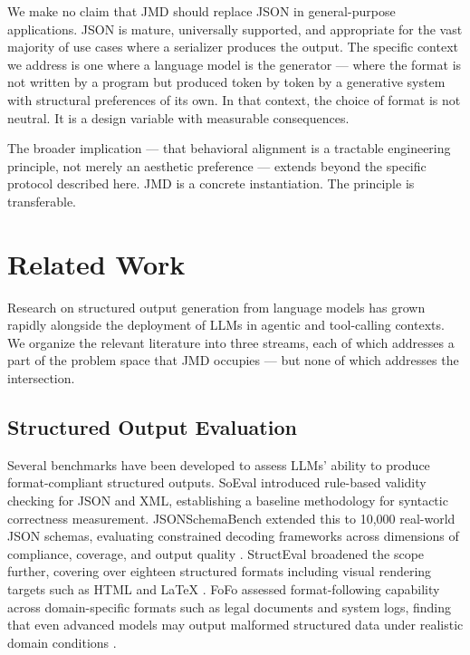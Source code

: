 \documentclass[11pt]{article}
\begin{document}
We make no claim that JMD should replace JSON in general-purpose applications. JSON is mature, universally supported, and appropriate for the vast majority of use cases where a serializer produces the output. The specific context we address is one where a language model is the generator --- where the format is not written by a program but produced token by token by a generative system with structural preferences of its own. In that context, the choice of format is not neutral. It is a design variable with measurable consequences.

The broader implication --- that behavioral alignment is a tractable engineering principle, not merely an aesthetic preference --- extends beyond the specific protocol described here. JMD is a concrete instantiation. The principle is transferable.

\section{Related Work}

Research on structured output generation from language models has grown rapidly alongside the deployment of LLMs in agentic and tool-calling contexts. We organize the relevant literature into three streams, each of which addresses a part of the problem space that JMD occupies --- but none of which addresses the intersection.

\subsection{Structured Output Evaluation}

Several benchmarks have been developed to assess LLMs' ability to produce format-compliant structured outputs. SoEval introduced rule-based validity checking for JSON and XML, establishing a baseline methodology for syntactic correctness measurement. JSONSchemaBench extended this to 10,000 real-world JSON schemas, evaluating constrained decoding frameworks across dimensions of compliance, coverage, and output quality \cite{geng2025jsonschemabench}. StructEval broadened the scope further, covering over eighteen structured formats including visual rendering targets such as HTML and LaTeX \cite{yang2025structeval}. FoFo assessed format-following capability across domain-specific formats such as legal documents and system logs, finding that even advanced models may output malformed structured data under realistic domain conditions \cite{xia2024fofo}.
\end{document}

